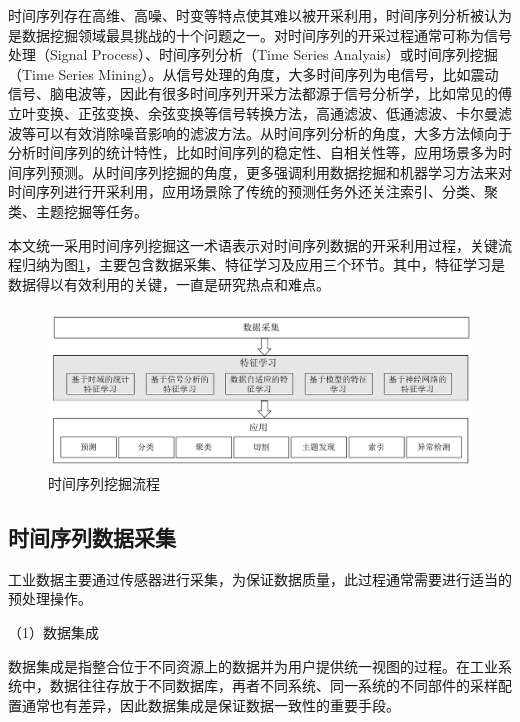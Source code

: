 时间序列存在高维、高噪、时变等特点使其难以被开采利用，时间序列分析被认为是数据挖掘领域最具挑战的十个问题之一\cite{langkvist2014review}。对时间序列的开采过程通常可称为信号处理（Signal Process）\cite{rabiner1975theory}、时间序列分析（Time Series Analyais）\cite{bisgaard2011time}或时间序列挖掘（Time Series Mining）\cite{fu2011review}。从信号处理的角度，大多时间序列为电信号，比如震动信号、脑电波等，因此有很多时间序列开采方法都源于信号分析学，比如常见的傅立叶变换、正弦变换、余弦变换等信号转换方法，高通滤波、低通滤波、卡尔曼滤波等可以有效消除噪音影响的滤波方法。从时间序列分析的角度，大多方法倾向于分析时间序列的统计特性，比如时间序列的稳定性、自相关性等，应用场景多为时间序列预测。从时间序列挖掘的角度，更多强调利用数据挖掘和机器学习方法来对时间序列进行开采利用，应用场景除了传统的预测任务外还关注索引、分类、聚类、主题挖掘等任务\cite{fu2011review}。

本文统一采用{\heiti 时间序列挖掘}这一术语表示对时间序列数据的开采利用过程，关键流程归纳为图\ref{fig:tsm-framework}，主要包含数据采集、特征学习及应用三个环节。其中，特征学习是数据得以有效利用的关键，一直是研究热点和难点\cite{langkvist2014review}。

\begin{figure}[H]
\centering
\includegraphics[scale=0.45]{figures/tsm-framework.png}
\caption{时间序列挖掘流程}
\label{fig:tsm-framework}
\end{figure}

\subsection{时间序列数据采集}

工业数据主要通过传感器进行采集，为保证数据质量，此过程通常需要进行适当的预处理操作。

（1）数据集成

数据集成是指整合位于不同资源上的数据并为用户提供统一视图的过程\cite{lenzerini2002data}。在工业系统中，数据往往存放于不同数据库，再者不同系统、同一系统的不同部件的采样配置通常也有差异，因此数据集成是保证数据一致性的重要手段。

